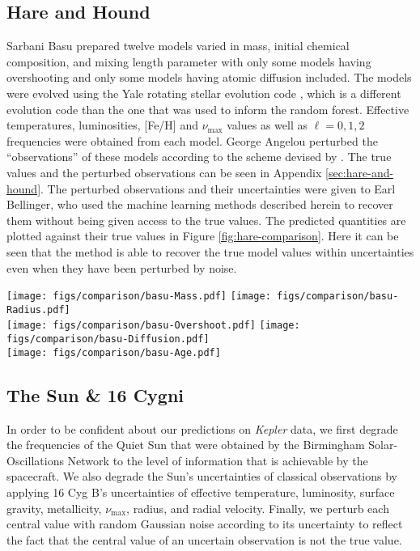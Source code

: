 \documentclass[manuscript]{aastex}
\begin{document}
\subsection{Hare and Hound} 
Sarbani Basu prepared twelve models varied in mass, initial chemical composition, and mixing length parameter with only some models having overshooting and only some models having atomic diffusion included. The models were evolved using the Yale rotating stellar evolution code \citep[YREC,][]{2008Ap&SS.316...31D}, which is a different evolution code than the one that was used to inform the random forest. Effective temperatures, luminosities, [Fe/H] and $\nu_{\max}$ values as well as $\ell=0,1,2$ frequencies were obtained from each model. George Angelou perturbed the ``observations'' of these models according to the scheme devised by \citet{spaceinn}. The true values and the perturbed observations can be seen in Appendix \ref{sec:hare-and-hound}. The perturbed observations and their uncertainties were given to Earl Bellinger, who used the machine learning methods described herein to recover them without being given access to the true values. The predicted quantities are plotted against their true values in Figure \ref{fig:hare-comparison}. Here it can be seen that the method is able to recover the true model values within uncertainties even when they have been perturbed by noise. 

\begin{figure*}
    \centering
    \texttt{[image: figs/comparison/basu-Mass.pdf]}\hfill
    \texttt{[image: figs/comparison/basu-Radius.pdf]}\\
    \texttt{[image: figs/comparison/basu-Overshoot.pdf]}\hfill
    \texttt{[image: figs/comparison/basu-Diffusion.pdf]}\\
    \texttt{[image: figs/comparison/basu-Age.pdf]}
    \caption{asdf \textbf{todo: write stuff} \label{fig:hare-comparison}}
\end{figure*}


\subsection{The Sun \& 16 Cygni}
In order to be confident about our predictions on \emph{Kepler} data, we first degrade the frequencies of the Quiet Sun that were obtained by the Birmingham Solar-Oscillations Network \citep[BiSON,][]{2014MNRAS.439.2025D} to the level of information that is achievable by the spacecraft. We also degrade the Sun's uncertainties of classical observations by applying 16 Cyg B's uncertainties of effective temperature, luminosity, surface gravity, metallicity, $\nu_{\max}$, radius, and radial velocity. Finally, we perturb each central value with random Gaussian noise according to its uncertainty to reflect the fact that the central value of an uncertain observation is not the true value. 
\end{document}
